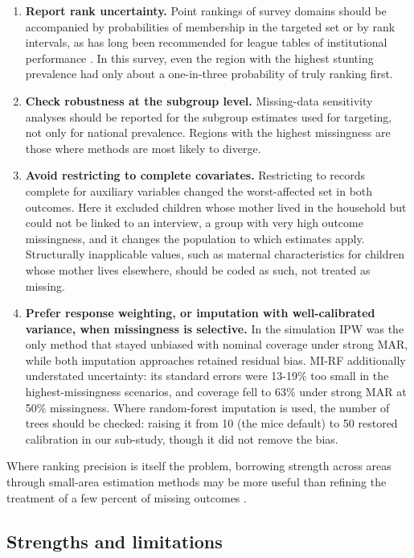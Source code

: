\documentclass[11pt,a4paper]{article}
\begin{document}
\begin{enumerate}
\def\labelenumi{\arabic{enumi}.}
\item
  \textbf{Report rank uncertainty.} Point rankings of survey domains
  should be accompanied by probabilities of membership in the targeted
  set or by rank intervals, as has long been recommended for league
  tables of institutional performance
  \cite{goldstein1996league,marshall1998reliability}. In this survey,
  even the region with the highest stunting prevalence had only about a
  one-in-three probability of truly ranking first.
\item
  \textbf{Check robustness at the subgroup level.} Missing-data
  sensitivity analyses should be reported for the subgroup estimates
  used for targeting, not only for national prevalence. Regions with the
  highest missingness are those where methods are most likely to
  diverge.
\item
  \textbf{Avoid restricting to complete covariates.} Restricting to
  records complete for auxiliary variables changed the worst-affected
  set in both outcomes. Here it excluded children whose mother lived in
  the household but could not be linked to an interview, a group with
  very high outcome missingness, and it changes the population to which
  estimates apply. Structurally inapplicable values, such as maternal
  characteristics for children whose mother lives elsewhere, should be
  coded as such, not treated as missing.
\item
  \textbf{Prefer response weighting, or imputation with well-calibrated
  variance, when missingness is selective.} In the simulation IPW was
  the only method that stayed unbiased with nominal coverage under
  strong MAR, while both imputation approaches retained residual bias.
  MI-RF additionally understated uncertainty: its standard errors were
  13-19\% too small in the highest-missingness scenarios, and coverage
  fell to 63\% under strong MAR at 50\% missingness. Where random-forest
  imputation is used, the number of trees should be checked: raising it
  from 10 (the mice default) to 50 restored calibration in our
  sub-study, though it did not remove the bias.
\end{enumerate}

Where ranking precision is itself the problem, borrowing strength across
areas through small-area estimation methods may be more useful than
refining the treatment of a few percent of missing outcomes
\cite{mercer2015space}.

\subsection{Strengths and limitations}\label{strengths-and-limitations}
\end{document}
